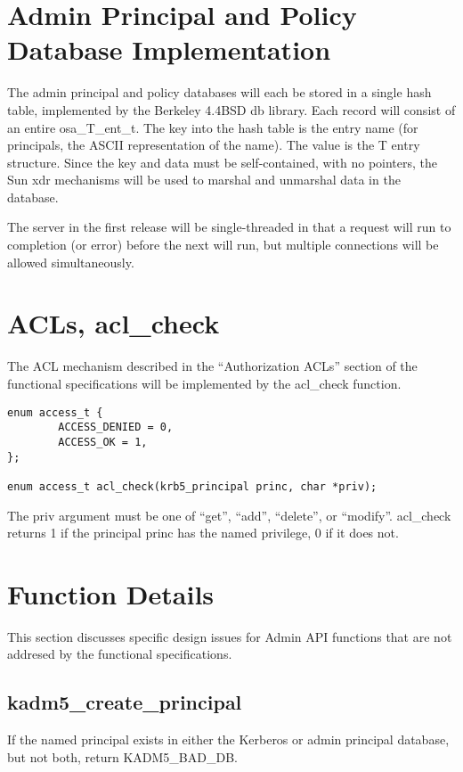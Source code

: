 \section{Admin Principal and Policy Database Implementation}

The admin principal and policy databases will each be stored in a
single hash table, implemented by the Berkeley 4.4BSD db library.
Each record will consist of an entire osa_T_ent_t.  The key into the
hash table is the entry name (for principals, the ASCII representation
of the name).  The value is the T entry structure.  Since the key and
data must be self-contained, with no pointers, the Sun xdr mechanisms
will be used to marshal and unmarshal data in the database.

The server in the first release will be single-threaded in that a
request will run to completion (or error) before the next will run,
but multiple connections will be allowed simultaneously.

\section{ACLs, acl_check}

The ACL mechanism described in the ``Authorization ACLs'' section of
the functional specifications will be implemented by the acl_check
function.

\begin{verbatim}
enum access_t {
        ACCESS_DENIED = 0,
        ACCESS_OK = 1,
};

enum access_t acl_check(krb5_principal princ, char *priv);
\end{verbatim}

The priv argument must be one of ``get'', ``add'', ``delete'', or
``modify''.  acl_check returns 1 if the principal princ has the named
privilege, 0 if it does not.

\section{Function Details}

This section discusses specific design issues for Admin API functions
that are not addresed by the functional specifications.

\subsection{kadm5_create_principal}

If the named principal exists in either the Kerberos or admin
principal database, but not both, return KADM5_BAD_DB.

